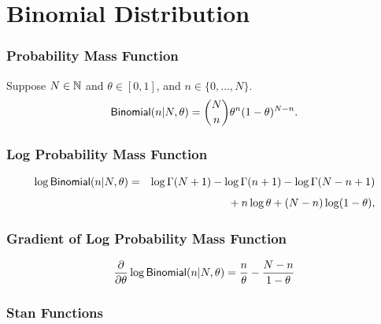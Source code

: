 \section{Binomial Distribution}

\subsubsection{Probability Mass Function}

Suppose $N \in \nats$ and $\theta \in [0,1]$, and $n \in
\{0,\ldots,N\}$.
\[
\distro{Binomial}(n|N,\theta)
= \binom{N}{n} \theta^n (1 - \theta)^{N - n}.
\]


\subsubsection{Log Probability Mass Function}

\begin{eqnarray*}
\log \distro{Binomial}(n|N,\theta)
& = &
\log \Gamma(N+1) - \log \Gamma(n + 1) - \log \Gamma(N- n + 1)
\\[4pt]
& & { } + n \log \theta + (N - n) \log (1 - \theta),
\end{eqnarray*}


\subsubsection{Gradient of Log Probability Mass Function}

\[
\frac{\partial}{\partial \theta} \log \distro{Binomial}(n|N,\theta)
= \frac{n}{\theta}
- \frac{N - n}{1 - \theta}
\]



\subsubsection{Stan Functions}

